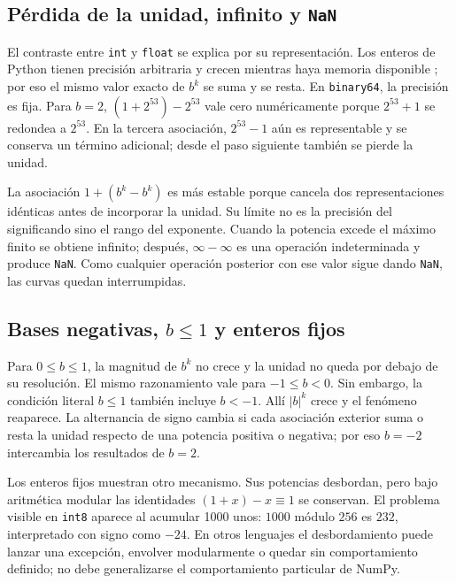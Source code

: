 \documentclass[11pt,a4paper]{article}
\newcommand{\codigo}[1]{\texttt{#1}}
\begin{document}
\subsection{Pérdida de la unidad, infinito y \codigo{NaN}}

El contraste entre \codigo{int} y \codigo{float} se explica por su representación. Los enteros de Python tienen precisión arbitraria y crecen mientras haya memoria disponible \citep{pythonint2026}; por eso el mismo valor exacto de $b^k$ se suma y se resta. En \codigo{binary64}, la precisión es fija. Para $b=2$, $(1+2^{53})-2^{53}$ vale cero numéricamente porque $2^{53}+1$ se redondea a $2^{53}$. En la tercera asociación, $2^{53}-1$ aún es representable y se conserva un término adicional; desde el paso siguiente también se pierde la unidad.

La asociación $1+(b^k-b^k)$ es más estable porque cancela dos representaciones idénticas antes de incorporar la unidad. Su límite no es la precisión del significando sino el rango del exponente. Cuando la potencia excede el máximo finito se obtiene infinito; después, $\infty-\infty$ es una operación indeterminada y produce \codigo{NaN}. Como cualquier operación posterior con ese valor sigue dando \codigo{NaN}, las curvas quedan interrumpidas.

\subsection{Bases negativas, \texorpdfstring{$b\le1$}{b menor o igual a 1} y enteros fijos}

Para $0\le b\le1$, la magnitud de $b^k$ no crece y la unidad no queda por debajo de su resolución. El mismo razonamiento vale para $-1\le b<0$. Sin embargo, la condición literal $b\le1$ también incluye $b<-1$. Allí $|b|^k$ crece y el fenómeno reaparece. La alternancia de signo cambia si cada asociación exterior suma o resta la unidad respecto de una potencia positiva o negativa; por eso $b=-2$ intercambia los resultados de $b=2$.

Los enteros fijos muestran otro mecanismo. Sus potencias desbordan, pero bajo aritmética modular las identidades $(1+x)-x\equiv1$ se conservan. El problema visible en \codigo{int8} aparece al acumular 1000 unos: $1000$ módulo $256$ es $232$, interpretado con signo como $-24$. En otros lenguajes el desbordamiento puede lanzar una excepción, envolver modularmente o quedar sin comportamiento definido; no debe generalizarse el comportamiento particular de NumPy.
\end{document}
